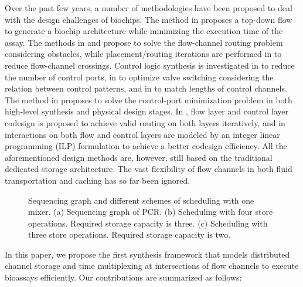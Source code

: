 
Over the past few years, a number of methodologies have been proposed to deal with the design challenges of biochips. The method in \cite{MinhassPMB12} proposes a top-down flow to generate a biochip architecture while minimizing the execution time of the assay. The methods in \cite{LinLCLH14} and \cite{huang2019timing} propose to solve the flow-channel routing problem considering obstacles, while placement/routing iterations are performed in \cite{WangRYHC16} to reduce flow-channel crossings. Control logic synthesis is investigated in \cite{MinhassPMH13} to reduce the number of control ports, in \cite{WangZYHLSC17} to optimize valve switching considering the relation between control patterns, and in \cite{YaoHC15} to match lengths of control channels. The method in \cite{Huang2019DAC} proposes to solve the control-port minimization problem in both high-level synthesis and physical design stages.  In \cite{YaoWRCH15}, flow layer and control layer codesign is proposed to achieve valid routing on both layers iteratively, and in \cite{TsengLLHS16} interactions on both flow and control layers are modeled by an integer linear programming (ILP) formulation to achieve a better codesign efficiency. All the aforementioned design methods are, however, still based on the traditional dedicated storage architecture. The vast flexibility of flow channels in both fluid transportation and caching has so far been ignored.

\begin{figure}[t]
{\figurefontsize
\centering

\caption{Sequencing graph and different schemes of scheduling with
one mixer.
(a) Sequencing
graph of PCR. (b) Scheduling with four store operations.
Required storage capacity is three.
(c) Scheduling with three store operations. Required storage capacity is two.}
\label{fig:pcr}
}
\vspace{-0.5cm}
\end{figure}
In this paper, we propose the first synthesis framework that models distributed channel storage and time multiplexing at intersections of flow channels to execute bioassays efficiently. Our contributions are summarized as follows:

